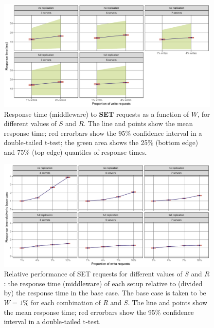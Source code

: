 \documentclass[11pt]{article}
\begin{document}
\begin{figure}[h]
\centering
\includegraphics[width=\textwidth]{../results/writes/graphs/response_time_vs_writes_set.pdf}
\caption{Response time (middleware) to \textbf{SET} requests as a function of $W$, for different values of $S$ and $R$. The line and points show the mean response time; red errorbars show the 95\% confidence interval in a double-tailed t-test; the green area shows the 25\% (bottom edge) and 75\% (top edge) quantiles of response times.}
\label{fig:exp3:res:responsetime:set}
\end{figure}

\begin{figure}[h]
\centering
\includegraphics[width=\textwidth]{../results/writes/graphs/relative_performance_set.pdf}
\caption{Relative performance of SET requests for different values of $S$ and $R$: the response time (middleware) of each setup relative to (divided by) the response time in the base case. The base case is taken to be $W=1\%$ for each combination of $R$ and $S$.
The line and points show the mean response time; red errorbars show the 95\% confidence interval in a double-tailed t-test.}
\label{fig:exp3:res:relative:set}
\end{figure}
\end{document}
